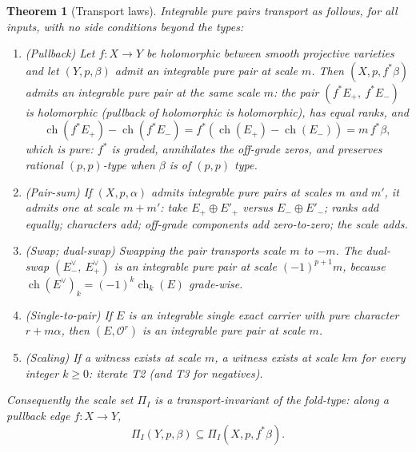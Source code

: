 \documentclass[11pt]{article}
\newtheorem{theorem}{Theorem}[section]
\newcommand{\ch}{\operatorname{ch}}
\newcommand{\Oo}{\mathcal{O}}
\begin{document}
\begin{theorem}[Transport laws]
\label{thm:T}
Integrable pure pairs transport as follows, for all inputs, with no
side conditions beyond the types:
\begin{enumerate}
\item[\textup{T1}] \emph{(Pullback)} Let $f\colon X\to Y$ be holomorphic
between smooth projective varieties and let $(Y,p,\beta)$ admit an
integrable pure pair at scale $m$.  Then $(X,p,f^*\beta)$ admits an
integrable pure pair at the same scale $m$: the pair
$(f^*E_+,\ f^*E_-)$ is holomorphic (pullback of holomorphic is
holomorphic), has equal ranks, and
\[
\ch(f^*E_+)-\ch(f^*E_-)=f^*(\ch(E_+)-\ch(E_-))=m\,f^*\beta ,
\]
which is pure: $f^*$ is graded, annihilates the off-grade zeros, and
preserves rational $(p,p)$-type when $\beta$ is of $(p,p)$ type.
\item[\textup{T2}] \emph{(Pair-sum)} If $(X,p,\alpha)$ admits integrable
pure pairs at scales $m$ and $m'$, it admits one at scale $m+m'$: take
$E_+\oplus E'_+$ versus $E_-\oplus E'_-$; ranks add equally; characters add;
off-grade components add zero-to-zero; the scale adds.
\item[\textup{T3}] \emph{(Swap; dual-swap)} Swapping the pair transports
scale $m$ to $-m$.  The dual-swap $(E_-^\vee,\ E_+^\vee)$ is an integrable
pure pair at scale $(-1)^{p+1}m$, because
$\ch(E^\vee)_k=(-1)^k\ch_k(E)$ grade-wise.
\item[\textup{T4}] \emph{(Single-to-pair)} If $E$ is an integrable single
exact carrier with pure character $r+m\alpha$, then $(E,\Oo^{r})$ is an
integrable pure pair at scale $m$.
\item[\textup{T5}] \emph{(Scaling)} If a witness exists at scale $m$, a
witness exists at scale $km$ for every integer $k\ge0$: iterate T2 (and T3
for negatives).
\end{enumerate}
Consequently the scale set $\Pi_I$ is a transport-invariant of the
fold-type: along a pullback edge $f\colon X\to Y$,
\[
\Pi_I(Y,p,\beta)\subseteq\Pi_I(X,p,f^*\beta).
\]
\end{theorem}
\end{document}
